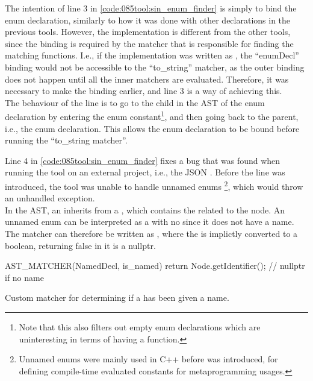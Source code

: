 The intention of line 3 in \cref{code:085tool:sin_enum_finder} is simply to bind the enum declaration, similarly to how it was done with other declarations in the previous tools.
However, the implementation is different from the other tools, since the binding is required by the matcher that is responsible for finding the matching  functions.
I.e., if the implementation was written as , the ``enumDecl'' binding would not be accessible to the ``to\_string'' matcher, as the outer binding does not happen until all the inner matchers are evaluated.
Therefore, it was necessary to make the binding earlier, and line 3 is a way of achieving this.\\
The behaviour of the line is to go to the child in the AST of the enum declaration by entering the enum constant\footnote{
    Note that this also filters out empty enum declarations which are uninteresting in terms of having a  function.
}, and then going back to the parent, i.e., the enum declaration. This allows the enum declaration to be bound before running the ``to\_string matcher''.

Line 4 in \cref{code:085tool:sin_enum_finder} fixes a bug that was found when running the tool on an external project, i.e., the JSON \cite{Lohmann22}.
Before the line was introduced, the tool was unable to handle unnamed enums
\footnote{
    Unnamed enums were mainly used in C++ before  was introduced, for defining compile-time evaluated constants for metaprogramming usages.
}, which would throw an unhandled exception.\\
In the AST, an  inherits from a , which contains the  related to the node.
An unnamed enum can be interpreted as a  with no  since it does not have a name.
The matcher can therefore be written as , where the  is implictly converted to a boolean, returning false in it is a nullptr.

\begin{listing}[H]
    \begin{cppcode}
AST_MATCHER(NamedDecl, is_named) {
	return Node.getIdentifier(); // nullptr if no name
}
    \end{cppcode}
    \caption{Custom matcher for determining if a  has been given a name.}
    \label{code:085tool:sin_is_named}
\end{listing}

